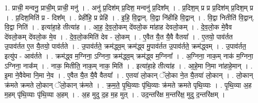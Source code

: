 \documentclass[17pt]{extarticle}
\begin{document}
1. प्राची॒ मन्वनु॒ प्राची॒म् प्राची॒ मनु॑ । . अनु॑ प्र॒दिश॑म् प्र॒दिश॒ मन्वनु॑ प्र॒दिश᳚म् । . प्र॒दिश॒म् प्र प्र प्र॒दिश॑म् प्र॒दिश॒म् प्र । . प्र॒दिश॒मिति॑ प्र - दिश᳚म् । . प्रेही॑हि॒ प्र प्रेहि॑ । . इ॒हि॒ वि॒द्वान्. वि॒द्वा नि॑हीहि वि॒द्वान् । . वि॒द्वा नितीति॑ वि॒द्वान्. वि॒द्वा निति॑ । . इत्या॑हा॒हे तीत्या॑ह । . आ॒ह॒ दे॒व॒लो॒कम् दे॑वलो॒क मा॑हाह देवलो॒कम् । . दे॒व॒लो॒क मे॒वैव दे॑वलो॒कम् दे॑वलो॒क मे॒व । . दे॒व॒लो॒कमिति॑ देव - लो॒कम् । . ए॒वैत यै॒त यै॒वै वैतया᳚ । . ए॒तयो॒ पाव॑र्तत उ॒पाव॑र्तत ए॒त यै॒तयो॒ पाव॑र्तते । . उ॒पाव॑र्तते॒ क्रम॑द्ध्व॒म् क्रम॑द्ध्व मु॒पाव॑र्तत उ॒पाव॑र्तते॒ क्रम॑द्ध्वम् । . उ॒पाव॑र्तत॒ इत्यु॑प - आव॑र्तते । . क्रम॑द्ध्व म॒ग्निना॒ ऽग्निना॒ क्रम॑द्ध्व॒म् क्रम॑द्ध्व म॒ग्निना᳚ । . अ॒ग्निना॒ नाक॒म् नाक॑ म॒ग्निना॒ ऽग्निना॒ नाक᳚म् । . नाक॒ मितीति॒ नाक॒म् नाक॒ मिति॑ । . इत्या॑हा॒हे तीत्या॑ह । . आ॒हे॒मा नि॒मा ना॑हाहे॒मान् । . इ॒मा ने॒वैवेमा नि॒मा ने॒व । . ए॒वैत यै॒त यै॒वै वैतया᳚ । . ए॒तया॑ लो॒कान् ॅलो॒का ने॒त यै॒तया॑ लो॒कान् । . लो॒कान् क्र॑मते क्रमते लो॒कान् ॅलो॒कान् क्र॑मते । . क्र॒म॒ते॒ पृ॒थि॒व्याः पृ॑थि॒व्याः क्र॑मते क्रमते पृथि॒व्याः । . पृ॒थि॒व्या अ॒ह म॒हम् पृ॑थि॒व्याः पृ॑थि॒व्या अ॒हम् । . अ॒ह मुदु द॒ह म॒ह मुत् । . उद॒न्तरि॑क्ष म॒न्तरि॑क्ष॒ मुदु द॒न्तरि॑क्षम् । \newline
\end{document}
